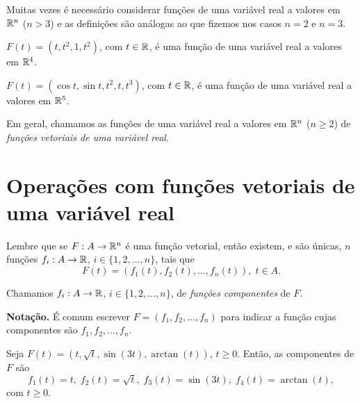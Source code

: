 Muitas vezes é necessário considerar funções de uma variável real a valores em \(\mathbb{R}^n\) (\(n>3\)) e as definições são análogas ao que fizemos nos casos \(n=2\) e \(n=3\).

\begin{example}
    \(F(t) = (t,t^2,1,t^2)\), com \(t\in\mathbb{R}\), é uma função de uma variável real a valores em \(\mathbb{R}^4\).
\end{example}

\begin{example}
    \(F(t) = (\cos t,\sin t, t^2, t, t^3)\), com \(t\in\mathbb{R}\), é uma função de uma variável real a valores em \(\mathbb{R}^5\).
\end{example}

Em geral, chamamos as funções de uma variável real a valores em \(\mathbb{R}^n\) (\(n\geq 2\)) de \textit{funções vetoriais de uma variável real}.

\section{Operações com funções vetoriais de uma variável real}

Lembre que se \(F: A\to\mathbb{R}^n\) é uma função vetorial, então existem, e são únicas, \(n\) funções \(f_i: A \to \mathbb{R}\), \(i\in\{1,2,\dots,n\}\), tais que \[F(t) = (f_1(t),f_2(t),\dots,f_n(t)),\; t\in A.\]

\begin{definition}
    Chamamos \(f_i: A \to \mathbb{R}\), \(i\in\{1,2,\dots,n\}\), de \textit{funções componentes}\label{Curva!Funções componentes} de \(F\).
\end{definition}

\textbf{Notação. } É comum escrever \(F = (f_1,f_2,\dots,f_n)\) para indicar a função cujas componentes são \(f_1, f_2,\dots,f_n\).

\begin{example}
    Seja \(F(t) = (t,\sqrt{t},\sin(3t),\arctan(t))\), \(t\geq 0\). Então, as componentes de \(F\) são \[f_1(t) = t,\; f_2(t) = \sqrt{t},\; f_3(t) = \sin(3t),\; f_4(t) = \arctan(t),\] com \(t\geq 0\).
\end{example}


